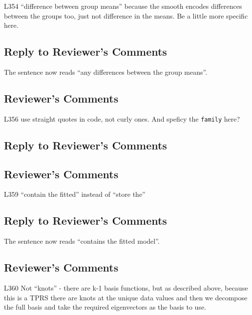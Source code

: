 \documentclass[
]{article}
\newcommand{\passthrough}[1]{#1}
\begin{document}
L354 ``difference between group means'' because the smooth encodes differences between the groups too, just not difference in the means. Be a little more specific here.

\hypertarget{section-22}{%
\subsection{\texorpdfstring{\textcolor{reviewersblue} {Reply to Reviewer's Comments}}{}}\label{section-22}}

The sentence now reads ``any differences between the group means''.

\hypertarget{reviewers-comments-23}{%
\subsection{Reviewer's Comments}\label{reviewers-comments-23}}

L356 use straight quotes in code, not curly ones. And speficy the \passthrough{\lstinline!family!} here?

\hypertarget{section-23}{%
\subsection{\texorpdfstring{\textcolor{reviewersblue} {Reply to Reviewer's Comments}}{}}\label{section-23}}

\hypertarget{reviewers-comments-24}{%
\subsection{Reviewer's Comments}\label{reviewers-comments-24}}

L359 ``contain the fitted'' instead of ``store the''

\hypertarget{section-24}{%
\subsection{\texorpdfstring{\textcolor{reviewersblue} {Reply to Reviewer's Comments}}{}}\label{section-24}}

The sentence now reads ``contains the fitted model''.

\hypertarget{reviewers-comments-25}{%
\subsection{Reviewer's Comments}\label{reviewers-comments-25}}

L360 Not ``knots'' - there are k-1 basis functions, but as described above, because this is a TPRS there are knots at the unique data values and then we decompose the full basis and take the required eigenvectors as the basis to use.
\end{document}
